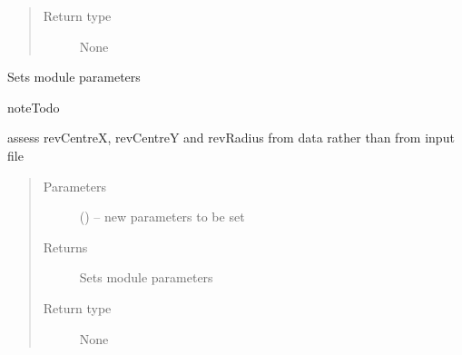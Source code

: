 \documentclass[letterpaper,10pt,english]{sphinxmanual}
\begin{document}
\begin{fulllineitems}
\begin{fulllineitems}
\begin{quote}
\begin{description}
\item[{Return type}] \leavevmode
None

\end{description}\end{quote}

\end{fulllineitems}


\begin{fulllineitems}
\label{\detokenize{MouseReferenceManual:Modules.Module_ABAQUS.Module_ABAQUS.setParameters}}
Sets module parameters

\begin{sphinxadmonition}{note}{Todo}

assess revCentreX, revCentreY and revRadius from data rather than from input file
\end{sphinxadmonition}
\begin{quote}\begin{description}
\item[{Parameters}] \leavevmode
{} () -- new parameters to be set

\item[{Returns}] \leavevmode
Sets module parameters

\item[{Return type}] \leavevmode
None

\end{description}\end{quote}

\end{fulllineitems}


\end{fulllineitems}

\end{document}
